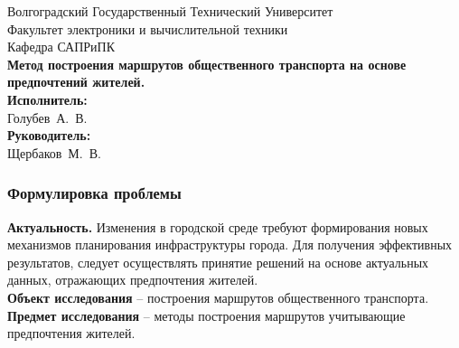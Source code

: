 \begin{frame} %
    \begin{center}
        \small
        Волгоградский Государственный Технический Университет \\
        Факультет электроники и вычислительной техники \\
        Кафедра САПРиПК \\
        \vspace{1.5cm}
        \normalsize
        \textbf{Метод построения маршрутов общественного транспорта на основе 
        предпочтений жителей.}\\
        \vspace{1.0cm}
        \raggedleft\small
        \textbf{Исполнитель:}\\Голубев~А.~В.\\
        \textbf{Руководитель:}\\Щербаков~М.~В.\\
        \vspace{1.5cm}
        \vspace{\fill}
         \the\year
    \end{center}
\end{frame}

\begin{frame} %
    \frametitle{Формулировка проблемы}
    \textbf{Актуальность.} Изменения в городской среде требуют формирования новых 
    механизмов планирования инфраструктуры города. Для получения эффективных 
    результатов, следует осуществлять принятие решений на основе актуальных 
    данных, отражающих предпочтения жителей.\\
    \textbf{Объект исследования} -- построения маршрутов общественного транспорта.\\
    \textbf{Предмет исследования} -- методы построения маршрутов учитывающие предпочтения жителей.
\end{frame}

